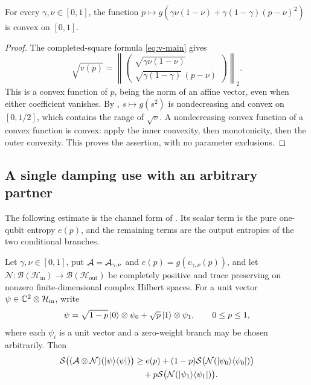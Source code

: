 \begin{lemma}\label{lem:e-convex}
For every $\gamma,\nu\in[0,1]$, the function
$p\mapsto g(\gamma\nu(1-\nu)+\gamma(1-\gamma)(p-\nu)^2)$
is convex on $[0,1]$.
\end{lemma}
\begin{proof}
The completed-square formula \eqref{eq:v-main} gives
\[
 \sqrt{v(p)}=
 \left\|\begin{pmatrix}
 \sqrt{\gamma\nu(1-\nu)}\\
 \sqrt{\gamma(1-\gamma)}\,(p-\nu)
 \end{pmatrix}\right\|_2.
\]
This is a convex function of $p$, being the norm of an affine vector,
even when either coefficient vanishes. By
, $s\mapsto g(s^2)$ is nondecreasing and convex on
$[0,1/2]$, which contains the range of $\sqrt{v}$. A nondecreasing
convex function of a convex function is convex: apply the inner
convexity, then monotonicity, then the outer convexity.
This proves the assertion, with no parameter exclusions.
\end{proof}

\subsection{A single damping use with an arbitrary partner}

The following estimate is the channel form of .
Its scalar term is the pure one-qubit entropy $e(p)$, and the remaining
terms are the output entropies of the two conditional branches.

\begin{lemma}\label{lem:partner-branch}
Let $\gamma,\nu\in[0,1]$, put $\mathcal A=\mathcal A_{\gamma,\nu}$ and
$e(p)=g(v_{\gamma,\nu}(p))$, and let
$\mathcal N:\mathcal B(\mathcal H_{\mathrm{in}})\to
\mathcal B(\mathcal H_{\mathrm{out}})$ be completely positive and
trace preserving on nonzero finite-dimensional complex Hilbert spaces.
For a unit vector $\psi\in\mathbb C^2\otimes\mathcal H_{\mathrm{in}}$, write
\[
 \psi=\sqrt{1-p}\,\lvert 0\rangle\otimes\psi_0
       +\sqrt p\,\lvert 1\rangle\otimes\psi_1,
 \qquad 0\le p\le1,
\]
where each $\psi_i$ is a unit vector and a zero-weight branch may be
chosen arbitrarily. Then
\begin{equation}\label{eq:partner-branch}
 \begin{split}
 \mathcal S\bigl((\mathcal A\otimes\mathcal N)(\lvert \psi\rangle\langle \psi\rvert)\bigr)
 &\ge e(p)+(1-p)\mathcal S\bigl(\mathcal N(\lvert \psi_0\rangle\langle \psi_0\rvert)\bigr)\\
 &\quad+p\mathcal S\bigl(\mathcal N(\lvert \psi_1\rangle\langle \psi_1\rvert)\bigr).
 \end{split}
\end{equation}
\end{lemma}

